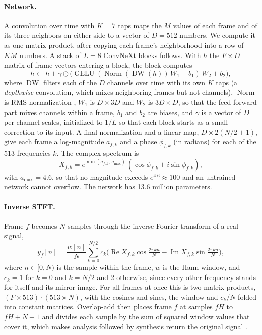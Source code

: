 \paragraph{Network.} A convolution over time with $K = 7$ taps maps the $M$
values of each frame and of its three neighbors on either side to a vector of
$D = 512$ numbers. We compute it as one matrix product, after copying each
frame's neighborhood into a row of $KM$ numbers. A stack of $L = 8$ ConvNeXt
blocks \cite{liu2022convnext} follows. With $h$ the $F \times D$ matrix of
frame vectors entering a block, the block computes
\[
h \leftarrow h + \gamma \odot \bigl(\operatorname{GELU}(\operatorname{Norm}
(\operatorname{DW}(h))\,W_1 + b_1)\,W_2 + b_2\bigr),
\]
where $\operatorname{DW}$ filters each of the $D$ channels over time with its
own $K$ taps (a \emph{depthwise} convolution, which mixes neighboring frames
but not channels), $\operatorname{Norm}$ is RMS normalization
\cite{zhang2019rmsnorm}, $W_1$ is $D \times 3D$ and $W_2$ is $3D \times D$, so
that the feed-forward part mixes channels within a frame, $b_1$ and $b_2$ are
biases, and $\gamma$ is a vector of $D$ per-channel scales, initialized to
$1/L$ so that each block starts as a small correction to its input. A final
normalization and a linear map, $D \times 2(N/2 + 1)$, give each frame a
log-magnitude $a_{f,k}$ and a phase $\phi_{f,k}$ (in radians) for each of the
513 frequencies $k$. The complex spectrum is
\[
X_{f,k} = e^{\min(a_{f,k},\, a_\text{max})}\,(\cos\phi_{f,k} + i\sin\phi_{f,k}),
\]
with $a_\text{max} = 4.6$, so that no magnitude exceeds $e^{4.6} \approx 100$
and an untrained network cannot overflow. The network has 13.6 million
parameters.

\paragraph{Inverse STFT.} Frame $f$ becomes $N$ samples through the inverse
Fourier transform of a real signal,
\[
y_f[n] = \frac{w[n]}{N}\sum_{k=0}^{N/2} c_k\bigl(\operatorname{Re}X_{f,k}\cos\tfrac{2\pi k n}{N} - \operatorname{Im}X_{f,k}\sin\tfrac{2\pi k n}{N}\bigr),
\]
where $n \in [0, N)$ is the sample within the frame, $w$ is the Hann window,
and $c_k = 1$ for $k = 0$ and $k = N/2$ and $2$ otherwise, since every other
frequency stands for itself and its mirror image. For all frames at once this
is two matrix products, $(F \times 513)\cdot(513 \times N)$, with the cosines
and sines, the window and $c_k/N$ folded into constant matrices. Overlap-add
then places frame $f$ at samples $fH$ to $fH + N - 1$ and divides each sample
by the sum of squared window values that cover it, which makes analysis
followed by synthesis return the original signal \cite{griffin1984signal}.

